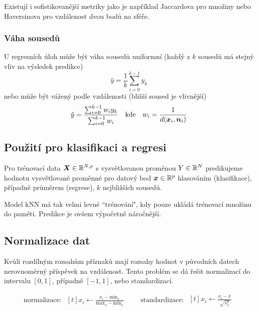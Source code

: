 \documentclass[../main.tex]{subfiles}
\begin{document}
Existují i sofistikovanější metriky jako je například Jaccardova pro množiny nebo Haversinova pro vzdálenost dvou bodů na sféře.

\subsubsection{Váha sousedů}

U regresních úloh může být váha sousedů uniformní (každý z $k$ sousedů má stejný vliv na výsledek predikce)
\[
    \hat{y} = \frac{1}{k} \sum_{i=0}^{k-1} y_k
\]
nebo může být vážený podle vzdálenosti (bližší soused je vlivnější)
\begin{equation*}
    \begin{aligned}[t]
        \hat{y} = \frac{\sum_{i=0}^{k-1} w_i y_k}{\sum_{i=0}^{k-1} w_i}
    \end{aligned}
    \quad \text{kde} \quad
    \begin{aligned}[t]
        w_i = \frac{1}{d(\bm{x}_i, \bm{n}_i)}
    \end{aligned}
\end{equation*}

\subsection{Použití pro klasifikaci a regresi}

Pro trénovací data $\bm{X} \in \mathbb{R}^{N, p}$ s vysvětlovanou proměnou $Y \in \mathbb{R}^N$ predikujeme hodnotu vysvětlované proměnné pro datový bod $\bm{x} \in \mathbb{R}^p$ hlasováním (klasifikace), případně průměrem (regrese), $k$ nejbližších sousedů.

Model kNN má tak velmi levné ``trénování", kdy pouze ukládá trénovací množinu do paměti. Predikce je ovšem výpočetně náročnější.

\subsection{Normalizace dat}

Kvůli rozdílným rozsahům příznaků mají rozsahy hodnot v původních datech nerovnoměrný příspěvek na vzdálenost. Tento problém se dá řešit normalizací do intervalu $[0,1]$, případně $[-1, 1]$, nebo standardizací.

\begin{equation*}
    \text{normalizace: }
    \begin{aligned}[t]
        x_i \leftarrow \frac{x_i - \text{min}_x}{\text{max}_x - \text{min}_x}
    \end{aligned}
    \quad\quad
    \text{standardizace: }
    \begin{aligned}[t]
        x_i \leftarrow \frac{x_i - \bar{x}}{\sqrt{s_x^2}}
    \end{aligned}
\end{equation*}
\end{document}
